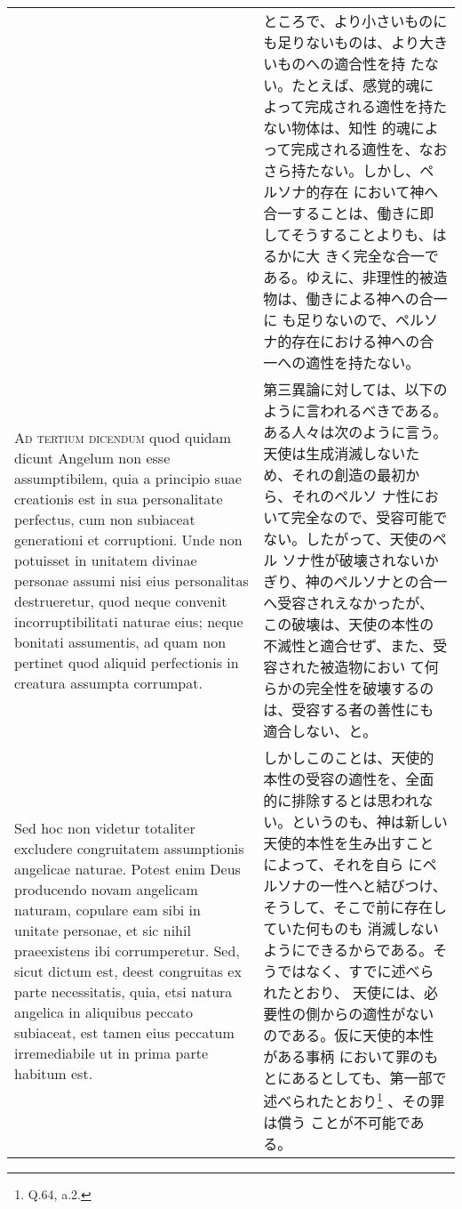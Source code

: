 \documentclass[10pt]{jsarticle} %
\begin{document}
\begin{longtable}{p{21em}p{21em}}
&

ところで、より小さいものにも足りないものは、より大きいものへの適合性を持
 たない。たとえば、感覚的魂によって完成される適性を持たない物体は、知性
 的魂によって完成される適性を、なおさら持たない。しかし、ペルソナ的存在
 において神へ合一することは、働きに即してそうすることよりも、はるかに大
 きく完全な合一である。ゆえに、非理性的被造物は、働きによる神への合一に
 も足りないので、ペルソナ的存在における神への合一への適性を持たない。

\\



{\scshape Ad tertium dicendum} quod quidam dicunt Angelum non esse assumptibilem,
quia a principio suae creationis est in sua personalitate perfectus, cum
non subiaceat generationi et corruptioni. Unde non potuisset in unitatem
divinae personae assumi nisi eius personalitas destrueretur, quod neque
convenit incorruptibilitati naturae eius; neque bonitati assumentis, ad
quam non pertinet quod aliquid perfectionis in creatura assumpta
corrumpat. 



&

第三異論に対しては、以下のように言われるべきである。
ある人々は次のように言う。天使は生成消滅しないため、それの創造の最初から、それのペルソ
 ナ性において完全なので、受容可能でない。したがって、天使のペル
 ソナ性が破壊されないかぎり、神のペルソナとの合一へ受容されえなかったが、
 この破壊は、天使の本性の不滅性と適合せず、また、受容された被造物におい
 て何らかの完全性を破壊するのは、受容する者の善性にも適合しない、と。

\\

Sed hoc non videtur totaliter excludere congruitatem
assumptionis angelicae naturae. Potest enim Deus producendo novam
angelicam naturam, copulare eam sibi in unitate personae, et sic nihil
praeexistens ibi corrumperetur. Sed, sicut dictum est, deest congruitas
ex parte necessitatis, quia, etsi natura angelica in aliquibus peccato
subiaceat, est tamen eius peccatum irremediabile ut in prima parte
habitum est.


&


しかしこのことは、天使的本性の受容の適性を、全面的に排除するとは思われな
 い。というのも、神は新しい天使的本性を生み出すことによって、それを自ら
 にペルソナの一性へと結びつけ、そうして、そこで前に存在していた何ものも
 消滅しないようにできるからである。そうではなく、すでに述べられたとおり、
 天使には、必要性の側からの適性がないのである。仮に天使的本性がある事柄
 において罪のもとにあるとしても、第一部で述べられたとおり\footnote{Q.64,
 a.2.} 、その罪は償う
 ことが不可能である。


\end{longtable}
\end{document}
